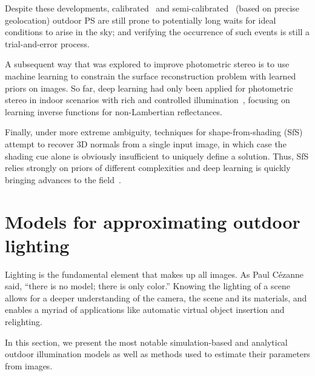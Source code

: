 Despite these developments, calibrated~\cite{yu-iccp-13} and semi-calibrated~\cite{jung-cvpr-15} (based on precise geolocation) outdoor PS are still prone to potentially long waits for ideal conditions to arise in the sky; and verifying the occurrence of such events is still a trial-and-error process.

A subsequent way that was explored to improve photometric stereo is to use machine learning to constrain the surface reconstruction problem with learned priors on images. So far, deep learning had only been applied for photometric stereo in indoor scenarios with rich and controlled illumination~\cite{yu-iccv-17,santo-iccv-17,taniai-arxiv-18,shi-tpami-18}, focusing on learning inverse functions for non-Lambertian reflectances.



Finally, under more extreme ambiguity, techniques for shape-from-shading (SfS)~\cite{Horn1989,Zhang1999,Langer1994,oxholm-eccv-12,johnson-cvpr-11,barron-pami-15} attempt to recover 3D normals from a single input image, in which case the shading cue alone is obviously insufficient to uniquely define a solution. Thus, SfS relies strongly on priors of different complexities and deep learning is quickly bringing advances to the field~\cite{eigen-iccv-15,shu-cvpr-17,wu-nips-17,shu-cvpr-17}.


\section{Models for approximating outdoor lighting}
\label{rw:skymodels}

Lighting is the fundamental element that makes up all images. As Paul Cézanne said, ``there is no model; there is only color.'' Knowing the lighting of a scene allows for a deeper understanding of the camera, the scene and its materials, and enables a myriad of applications like automatic virtual object insertion and relighting.

In this section, we present the most notable simulation-based and analytical outdoor illumination models as well as methods used to estimate their parameters from images.

